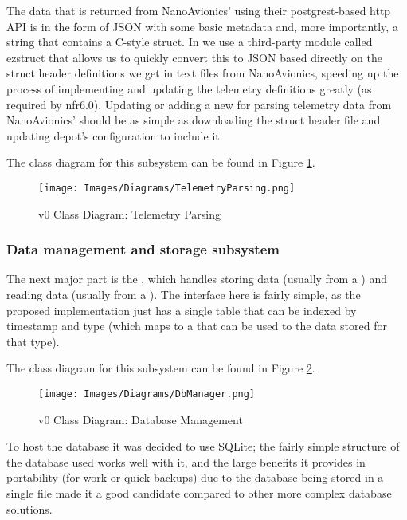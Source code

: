 The data that is returned from NanoAvionics’ using their \Gls{postgrest}-based \acrshort{http} API is in the form of JSON with some basic metadata and, more importantly, a string that contains a  C-style \gls{struct}. In  we use a third-party module called \gls{ezstruct} that allows us to quickly convert this to JSON based directly on the \gls{struct} header definitions we get in text files from NanoAvionics, speeding up the process of implementing and updating the telemetry definitions greatly (as required by \acrshort{nfr}6.0). Updating or adding a new  for parsing telemetry data from NanoAvionics’ should be as simple as downloading the \gls{struct} header file and updating \Gls{depot}'s configuration to include it.

The class diagram for this subsystem can be found in Figure \ref{fig:cdparsing}.

\begin{figure}[H]
  \centering
  \texttt{[image: Images/Diagrams/TelemetryParsing.png]}
  \caption{v0 Class Diagram: Telemetry Parsing}
  \label{fig:cdparsing}
\end{figure}

\subsubsection{Data management and storage subsystem}
The next major part is the , which handles storing data (usually from a ) and reading data (usually from a ). The interface here is fairly simple, as the proposed implementation just has a single table that can be indexed by timestamp and type (which maps to a  that can be used to  the data stored for that type).


The class diagram for this subsystem can be found in Figure \ref{fig:cddb}.

\begin{figure}[H]
  \centering
  \texttt{[image: Images/Diagrams/DbManager.png]}
  \caption{v0 Class Diagram: Database Management}
  \label{fig:cddb}
\end{figure}

To host the database it was decided to use SQLite; the fairly simple structure of the database used works well with it, and the large benefits it provides in portability (for  work or quick backups) due to the database being stored in a single file made it a good candidate compared to other more complex database solutions.

